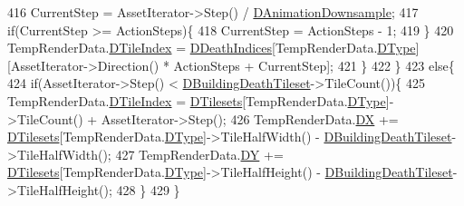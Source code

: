 \begin{DoxyCode}
{416                                                     CurrentStep = AssetIterator->Step() / 
      \hyperlink{classCAssetRenderer_a13ea9a19837c39e57db499f53366c5b8}{DAnimationDownsample};
417                                                     \textcolor{keywordflow}{if}(CurrentStep >= ActionSteps)\{
418                                                         CurrentStep = ActionSteps - 1;
419                                                     \}
420                                                     TempRenderData.\hyperlink{structSAssetRenderData_a8c97c7f34d5b359f6fa23ce215a09929}{DTileIndex} = 
      \hyperlink{classCAssetRenderer_a31be8b0e563072ee1168ab11154d15c8}{DDeathIndices}[TempRenderData.\hyperlink{structSAssetRenderData_ae986cfe9d4238fa31fb511b40392d97f}{DType}][AssetIterator->Direction() * ActionSteps + 
      CurrentStep];
421                                                 \}
422                                             \}
423                                             \textcolor{keywordflow}{else}\{
424                                                 \textcolor{keywordflow}{if}(AssetIterator->Step() < 
      \hyperlink{classCAssetRenderer_a9eb73be9e270946c01ba769112e92d1d}{DBuildingDeathTileset}->TileCount())\{
425                                                     TempRenderData.\hyperlink{structSAssetRenderData_a8c97c7f34d5b359f6fa23ce215a09929}{DTileIndex} = 
      \hyperlink{classCAssetRenderer_ae8201de704851c1de6424a8da77b785e}{DTilesets}[TempRenderData.\hyperlink{structSAssetRenderData_ae986cfe9d4238fa31fb511b40392d97f}{DType}]->TileCount() + AssetIterator->Step();
426                                                     TempRenderData.\hyperlink{structSAssetRenderData_ab432edfd1146e38a92576b78e2ad5581}{DX} += 
      \hyperlink{classCAssetRenderer_ae8201de704851c1de6424a8da77b785e}{DTilesets}[TempRenderData.\hyperlink{structSAssetRenderData_ae986cfe9d4238fa31fb511b40392d97f}{DType}]->TileHalfWidth() - 
      \hyperlink{classCAssetRenderer_a9eb73be9e270946c01ba769112e92d1d}{DBuildingDeathTileset}->TileHalfWidth();
427                                                     TempRenderData.\hyperlink{structSAssetRenderData_af27e8a46e21a0935983bfc0d34d9ceba}{DY} += 
      \hyperlink{classCAssetRenderer_ae8201de704851c1de6424a8da77b785e}{DTilesets}[TempRenderData.\hyperlink{structSAssetRenderData_ae986cfe9d4238fa31fb511b40392d97f}{DType}]->TileHalfHeight() - 
      \hyperlink{classCAssetRenderer_a9eb73be9e270946c01ba769112e92d1d}{DBuildingDeathTileset}->TileHalfHeight();
428                                                 \}
429                                             \}
}
\end{DoxyCode}
